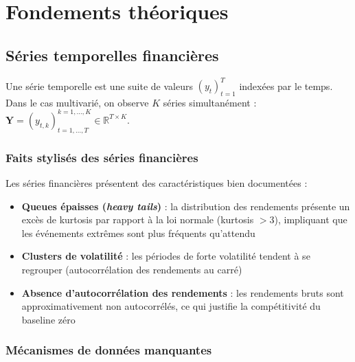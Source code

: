 \documentclass[12pt,a4paper]{article}
\newcounter{defctr}[section]
\renewcommand{\thedefctr}{\thesection.\arabic{defctr}}
\newenvironment{definition}[1][]
  {\refstepcounter{defctr}\begin{tcolorbox}[defstyle,title={D\'efinition~\thedefctr\if\relax\detokenize{#1}\relax\else~--- #1\fi}]}
  {\end{tcolorbox}}
\newcommand{\R}{\mathbb{R}}
\begin{document}
\section{Fondements th\'eoriques}

\subsection{S\'eries temporelles financi\`eres}

\begin{definition}[S\'erie temporelle]
Une s\'erie temporelle est une suite de valeurs $(y_t)_{t=1}^T$ index\'ees par le temps. Dans le cas multivari\'e, on observe $K$ s\'eries simultan\'ement : $\bm{Y} = (y_{t,k})_{t=1,\ldots,T}^{k=1,\ldots,K} \in \R^{T \times K}$.
\end{definition}

\subsubsection{Faits stylis\'es des s\'eries financi\`eres}

Les s\'eries financi\`eres pr\'esentent des caract\'eristiques bien document\'ees \cite{cont2001} :
\begin{itemize}
    \item \textbf{Queues \'epaisses (\textit{heavy tails})} : la distribution des rendements pr\'esente un exc\`es de kurtosis par rapport \`a la loi normale (kurtosis $> 3$), impliquant que les \'ev\'enements extr\^emes sont plus fr\'equents qu'attendu
    \item \textbf{Clusters de volatilit\'e} : les p\'eriodes de forte volatilit\'e tendent \`a se regrouper (autocorr\'elation des rendements au carr\'e)
    \item \textbf{Absence d'autocorr\'elation des rendements} : les rendements bruts sont approximativement non autocorr\'el\'es, ce qui justifie la comp\'etitivit\'e du baseline z\'ero
\end{itemize}

\subsubsection{M\'ecanismes de donn\'ees manquantes}
\end{document}
